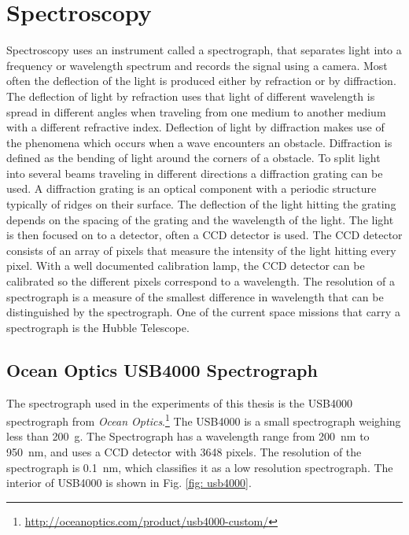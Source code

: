 \section{Spectroscopy}
Spectroscopy uses an instrument called a spectrograph, that separates light into a frequency or wavelength spectrum and records the signal using a camera. Most often the deflection of the light is produced either by refraction or by diffraction. The deflection of light by refraction uses that light of different wavelength is spread in different angles when traveling from one medium to another medium with a different refractive index. Deflection of light by diffraction makes use of the phenomena which occurs when a wave encounters an obstacle. Diffraction is defined as the bending of light around the corners of a obstacle. To split light into several beams traveling in different directions a diffraction grating can be used. A diffraction grating is an optical component with a periodic structure typically of ridges on their surface. The deflection of the light hitting the grating depends on the spacing of the grating and the wavelength of the light. The light is then focused on to a detector, often a CCD detector is used. The CCD detector consists of an array of pixels that measure the intensity of the light hitting every pixel. With a well documented calibration lamp, the CCD detector can be calibrated so the different pixels correspond to a wavelength. The resolution of a spectrograph is a measure of the smallest difference in wavelength that can be distinguished by the spectrograph. One of the current space missions that carry a spectrograph is the Hubble Telescope.

\subsection{Ocean Optics USB4000 Spectrograph}
The spectrograph used in the experiments of this thesis is the USB4000 spectrograph from \emph{Ocean Optics}.\footnote{\url{http://oceanoptics.com/product/usb4000-custom/}}
The USB4000 is a small spectrograph weighing less than \SI{200}{\gram}. The Spectrograph has a wavelength range from \SI{200}{\nano\meter} to \SI{950}{\nano\meter}, and uses a CCD detector with 3648 pixels. The resolution of the spectrograph is \SI{0.1}{\nano\meter}, which classifies it as a low resolution spectrograph. The interior of USB4000 is shown in Fig. \ref{fig: usb4000}.


